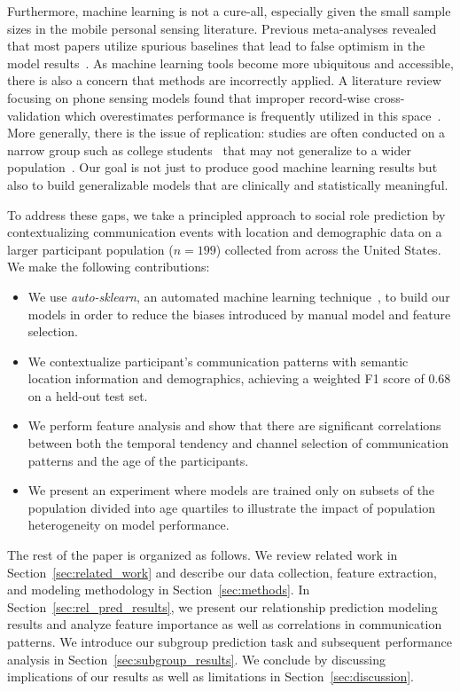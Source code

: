\documentclass[acmlarge]{acmart}
\begin{document}
Furthermore, machine learning is not a cure-all, especially given the small sample sizes in the mobile personal sensing literature. Previous meta-analyses revealed that most papers utilize spurious baselines that lead to false optimism in the model results~\cite{demasi2017meaningless}. As machine learning tools become more ubiquitous and accessible, there is also a concern that methods are incorrectly applied. A literature review focusing on phone sensing models found that improper record-wise cross-validation which overestimates performance is frequently utilized in this space~\cite{saeb2016voodoo}. More generally, there is the issue of replication: studies are often conducted on a narrow group such as college students~\cite{eagle2006reality, wang2014studentlife} that may not generalize to a wider population~\cite{mohr2017personal}. Our goal is not just to produce good machine learning results but also to build generalizable models that are clinically and statistically meaningful.

To address these gaps, we take a principled approach to social role prediction by contextualizing communication events with location and demographic data on a larger participant population ($n=199$) collected from across the United States. We make the following contributions:

\begin{itemize}
    \item We use \textit{auto-sklearn}, an automated machine learning technique~\cite{feurer2015efficient}, to build our models in order to reduce the biases introduced by manual model and feature selection.
    \item We contextualize participant's communication patterns with semantic location information and demographics, achieving a weighted F1 score of 0.68 on a held-out test set.
    \item We perform feature analysis and show that there are significant correlations between both the temporal tendency and channel selection of communication patterns and the age of the participants.
    \item We present an experiment where models are trained only on subsets of the population divided into age quartiles to illustrate the impact of population heterogeneity on model performance.
\end{itemize}

The rest of the paper is organized as follows. We review related work in Section~\ref{sec:related_work} and describe our data collection, feature extraction, and modeling methodology in Section~\ref{sec:methods}. In Section~\ref{sec:rel_pred_results}, we present our relationship prediction modeling results and analyze feature importance as well as correlations in communication patterns. We introduce our subgroup prediction task and subsequent performance analysis in Section~\ref{sec:subgroup_results}. We conclude by discussing implications of our results as well as limitations in Section~\ref{sec:discussion}.
\end{document}
